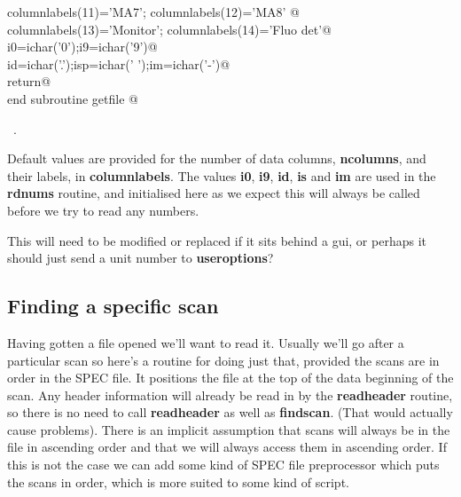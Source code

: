 \documentclass[10pt,a4paper,notitlepage]{article}
\newcommand{\var}[1]{\textbf{\textsf{#1}}} %
\newcommand{\code}[1]{\textbf{\textsf{#1}}} %
\newcommand{\mod}[1]{\textbf{\textsf{#1}}} %
\begin{document}
\begin{flushleft}
\begin{minipage}{\linewidth}
\begin{list}{}{}
\mbox{}\verb@      columnlabels(11)='MA7';      columnlabels(12)='MA8'     @\\
\mbox{}\verb@      columnlabels(13)='Monitor';  columnlabels(14)='Fluo det'@\\
\mbox{}\verb@      i0=ichar('0');i9=ichar('9')@\\
\mbox{}\verb@      id=ichar('.');isp=ichar(' ');im=ichar('-')@\\
\mbox{}\verb@      return@\\
\mbox{}\verb@      end subroutine getfile                                                 @{\NWsep}
\end{list}
\vspace{-1.5ex}
\footnotesize
\begin{list}{}{\setlength{\itemsep}{-\parsep}\setlength{\itemindent}{-\leftmargin}}
\item \NWtxtMacroRefIn\ .

\item{}
\end{list}
\end{minipage}\vspace{4ex}
\end{flushleft}
Default values are provided for the number of data columns, \var{ncolumns}, 
and their labels, in \var{columnlabels}. The values \var{i0}, \var{i9}, 
\var{id}, \var{is} and \var{im} are used in the \code{rdnums}
routine, and initialised here as we expect this will
always be called before we try to read any numbers.

This will need to be modified or replaced if it sits behind a gui, or perhaps 
it should just send a unit number to \mod{useroptions}?

\subsection{Finding a specific scan}
Having gotten a file opened we'll want to read it. 
Usually we'll go after a particular scan so here's a routine for doing 
just that, provided the scans are in order in the SPEC file. 
It positions the file at the top of the data beginning of the scan. 
Any header information will already be read in by the \code{readheader}
routine, so there is no need to call \code{readheader} as well as
\code{findscan}. (That would actually cause problems).
There is an implicit assumption that scans will always be in the file
in ascending order and that we will always access them in ascending 
order. If this is not the case we can add some kind of SPEC file preprocessor
which puts the scans in order, which is more suited to some kind of script.
\end{document}

